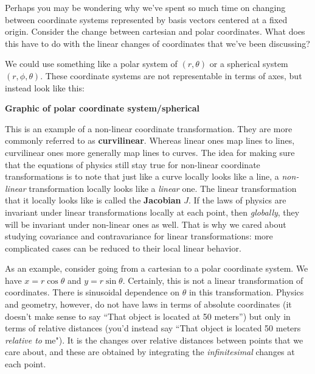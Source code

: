 \documentclass[../master.tex]{subfiles}
\begin{document}
	Perhaps you may be wondering why we've spent so much time on changing between coordinate systems represented by basis vectors centered at a fixed origin. Consider the change between cartesian and polar coordinates. What does this have to do with the linear changes of coordinates that we've been discussing?
	
	We could use something like a polar system of $(r,\theta)$ or a spherical system $(r, \phi, \theta)$. These coordinate systems are not representable in terms of axes, but instead look like this:
	
	\textbf{Graphic of polar coordinate system/spherical} 
	
	This is an example of a non-linear coordinate transformation. They are more commonly referred to as \textbf{curvilinear}. Whereas linear ones map lines to lines, curvilinear ones more generally map lines to curves. The idea for making sure that the equations of physics still stay true for non-linear coordinate transformations is to note that just like a curve locally looks like a line, a \emph{non-linear} transformation locally looks like a \emph{linear} one. The linear transformation that it locally looks like is called the \textbf{Jacobian}  $J$. If the laws of physics are invariant under linear transformations locally at each point, then \emph{globally}, they will be invariant under non-linear ones as well. That is why we cared about studying covariance and contravariance for linear transformations: more complicated cases can be reduced to their local linear behavior.
	
	As an example, consider going from a cartesian to a polar coordinate system. We have $x = r \cos \theta$ and $y = r \sin \theta$. Certainly, this is not a linear transformation of coordinates. There is sinusoidal dependence on $\theta$ in this transformation. Physics and geometry, however, do not have laws in terms of absolute coordinates (it doesn't make sense to say ``That object is located at 50 meters'') but only in terms of relative distances (you'd instead say ``That object is located 50 meters \emph{relative to} me"). It is the changes over relative distances between points that we care about, and these are obtained by integrating the \emph{infinitesimal} changes at each point. 
	
\end{document}

